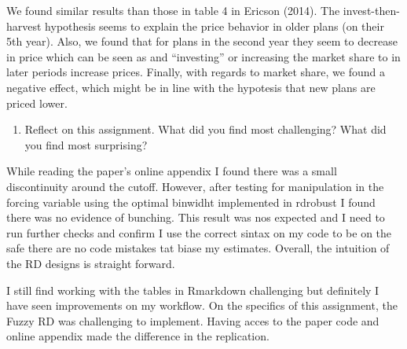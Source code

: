 \documentclass[
  12pt,
]{article}
\providecommand{\tightlist}{%
  \setlength{\itemsep}{0pt}\setlength{\parskip}{0pt}}
\begin{document}
We found similar results than those in table 4 in Ericson (2014). The
invest-then-harvest hypothesis seems to explain the price behavior in
older plans (on their 5th year). Also, we found that for plans in the
second year they seem to decrease in price which can be seen as and
``investing'' or increasing the market share to in later periods
increase prices. Finally, with regards to market share, we found a
negative effect, which might be in line with the hypotesis that new
plans are priced lower.

\begin{enumerate}
\def\labelenumi{\arabic{enumi}.}
\setcounter{enumi}{9}
\tightlist
\item
  Reflect on this assignment. What did you find most challenging? What
  did you find most surprising?
\end{enumerate}

While reading the paper's online appendix I found there was a small
discontinuity around the cutoff. However, after testing for manipulation
in the forcing variable using the optimal binwidht implemented in
rdrobust I found there was no evidence of bunching. This result was nos
expected and I need to run further checks and confirm I use the correct
sintax on my code to be on the safe there are no code mistakes tat biase
my estimates. Overall, the intuition of the RD designs is straight
forward.

I still find working with the tables in Rmarkdown challenging but
definitely I have seen improvements on my workflow. On the specifics of
this assignment, the Fuzzy RD was challenging to implement. Having acces
to the paper code and online appendix made the difference in the
replication.
\end{document}
